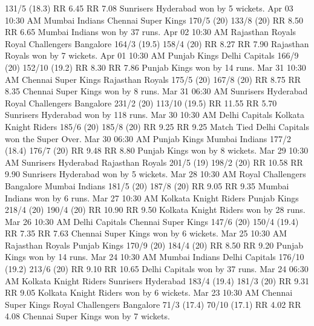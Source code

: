 131/5 (18.3)
RR 6.45
RR 7.08
Sunrisers Hyderabad won by 5 wickets.
Apr 03
10:30 AM
Mumbai Indians
Chennai Super Kings
170/5 (20)
133/8 (20)
RR 8.50
RR 6.65
Mumbai Indians won by 37 runs.
Apr 02
10:30 AM
Rajasthan Royals
Royal Challengers Bangalore
164/3 (19.5)
158/4 (20)
RR 8.27
RR 7.90
Rajasthan Royals won by 7 wickets.
Apr 01
10:30 AM
Punjab Kings
Delhi Capitals
166/9 (20)
152/10 (19.2)
RR 8.30
RR 7.86
Punjab Kings won by 14 runs.
Mar 31
10:30 AM
Chennai Super Kings
Rajasthan Royals
175/5 (20)
167/8 (20)
RR 8.75
RR 8.35
Chennai Super Kings won by 8 runs.
Mar 31
06:30 AM
Sunrisers Hyderabad
Royal Challengers Bangalore
231/2 (20)
113/10 (19.5)
RR 11.55
RR 5.70
Sunrisers Hyderabad won by 118 runs.
Mar 30
10:30 AM
Delhi Capitals
Kolkata Knight Riders
185/6 (20)
185/8 (20)
RR 9.25
RR 9.25
Match Tied Delhi Capitals won the Super Over.
Mar 30
06:30 AM
Punjab Kings
Mumbai Indians
177/2 (18.4)
176/7 (20)
RR 9.48
RR 8.80
Punjab Kings won by 8 wickets.
Mar 29
10:30 AM
Sunrisers Hyderabad
Rajasthan Royals
201/5 (19)
198/2 (20)
RR 10.58
RR 9.90
Sunrisers Hyderabad won by 5 wickets.
Mar 28
10:30 AM
Royal Challengers Bangalore
Mumbai Indians
181/5 (20)
187/8 (20)
RR 9.05
RR 9.35
Mumbai Indians won by 6 runs.
Mar 27
10:30 AM
Kolkata Knight Riders
Punjab Kings
218/4 (20)
190/4 (20)
RR 10.90
RR 9.50
Kolkata Knight Riders won by 28 runs.
Mar 26
10:30 AM
Delhi Capitals
Chennai Super Kings
147/6 (20)
150/4 (19.4)
RR 7.35
RR 7.63
Chennai Super Kings won by 6 wickets.
Mar 25
10:30 AM
Rajasthan Royals
Punjab Kings
170/9 (20)
184/4 (20)
RR 8.50
RR 9.20
Punjab Kings won by 14 runs.
Mar 24
10:30 AM
Mumbai Indians
Delhi Capitals
176/10 (19.2)
213/6 (20)
RR 9.10
RR 10.65
Delhi Capitals won by 37 runs.
Mar 24
06:30 AM
Kolkata Knight Riders
Sunrisers Hyderabad
183/4 (19.4)
181/3 (20)
RR 9.31
RR 9.05
Kolkata Knight Riders won by 6 wickets.
Mar 23
10:30 AM
Chennai Super Kings
Royal Challengers Bangalore
71/3 (17.4)
70/10 (17.1)
RR 4.02
RR 4.08
Chennai Super Kings won by 7 wickets.